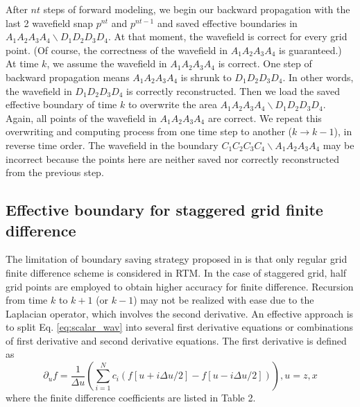 After $nt$ steps of forward modeling, we begin our backward propagation with the last 2 wavefield snap $p^{nt}$ and $p^{nt-1}$ and saved effective boundaries in $A_1A_2A_3A_4\backslash D_1D_2D_3D_4$. At that moment, the wavefield is correct for every grid point. (Of course, the correctness of the wavefield in $A_1A_2A_3A_4$ is guaranteed.) At time $k$, we assume the wavefield in $A_1A_2A_3A_4$ is correct. One step of backward propagation means $A_1A_2A_3A_4$ is shrunk to $D_1D_2D_3D_4$. In other words, the wavefield in $D_1D_2D_3D_4$ is correctly reconstructed. Then we load the saved effective boundary of time $k$ to overwrite the area $A_1A_2A_3A_4\backslash D_1D_2D_3D_4$. Again, all points of the wavefield in $A_1A_2A_3A_4$ are correct. We repeat this overwriting and computing process from one time step to another ($k\rightarrow k-1$), in reverse time order. The wavefield in the boundary $C_1C_2C_3C_4\backslash A_1A_2A_3A_4$ may be incorrect because the points here are neither saved nor correctly reconstructed from the previous step.





\subsection{Effective boundary for staggered grid finite difference}

The limitation of boundary saving strategy proposed in \cite{dussaud2008computational} is that only regular grid finite difference scheme is considered in RTM. In the case of staggered grid, half grid points are employed to obtain higher accuracy for finite difference. Recursion from time $k$ to $k+1$ (or $k-1$) may not be realized with ease due to the Laplacian operator, which involves the second derivative. An effective approach is to split Eq. \eqref{eq:scalar_wav} into several first derivative equations or combinations of first derivative and second derivative equations. The first derivative is defined as
\begin{equation}
\partial_u f=\frac{1}{\Delta u}\left(
\sum_{i=1}^{N} c_i(f[u+i\Delta u/2]-f[u-i\Delta u/2])\right), u=z,x
\end{equation}
where the finite difference coefficients are listed in Table 2.


